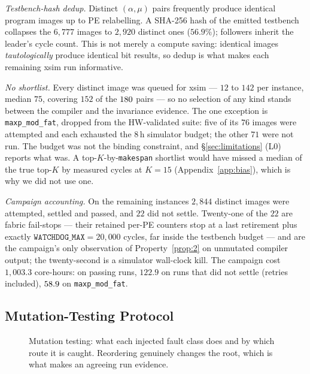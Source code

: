 \documentclass[journal,10pt]{IEEEtran}
\theoremstyle{plain}
\theoremstyle{definition}
\theoremstyle{remark}
\newcommand{\sv}[1]{\texttt{#1}}
\newcommand{\asgn}{\ensuremath{\alpha}}
\newcommand{\map}{\ensuremath{\mu}}
\begin{document}
\emph{Testbench-hash dedup.} Distinct $(\asgn, \map)$ pairs frequently produce
identical program images up to PE relabelling. A SHA-256 hash of the emitted
testbench collapses the $6{,}777$ images to $2{,}920$ distinct ones
($56.9\%$); followers inherit the leader's cycle count. This is not merely a
compute saving: identical images \emph{tautologically} produce identical bit
results, so dedup is what makes each remaining xsim run informative.

\emph{No shortlist.} Every distinct image was queued for xsim --- $12$ to
$142$ per instance, median $75$, covering $152$ of the $180$ pairs --- so no
selection of any kind stands between the compiler and the invariance
evidence. The one exception is \sv{maxp\_mod\_fat}, dropped from the
HW-validated suite: five of its $76$ images were attempted and each exhausted
the $8$\,h simulator budget; the other $71$ were not run. The budget was not
the binding constraint, and \S\ref{sec:limitations} (L0) reports what was. A
top-$K$-by-\sv{makespan} shortlist would have missed a median
\TournLeakPctFifteen{} of the true top-$K$ by measured cycles at $K = 15$
(Appendix~\ref{app:bias}), which is why we did not use one.

\emph{Campaign accounting.} On the \TournNInst{} remaining instances $2{,}844$
distinct images were attempted, \WallTBs{} settled and passed, and $22$ did
not settle. Twenty-one of the $22$ are fabric fail-stops --- their retained
per-PE counters stop at a last retirement plus exactly $\sv{WATCHDOG\_MAX} =
20{,}000$ cycles, far inside the testbench budget --- and are the campaign's
only observation of Property~\ref{prop:2} on unmutated compiler output; the
twenty-second is a simulator wall-clock kill. The campaign cost $1{,}003.3$
core-hours: \WallTotalH{} on passing runs, $122.9$ on runs that did not settle
(retries included), $58.9$ on \sv{maxp\_mod\_fat}.

\subsection{Mutation-Testing Protocol}\label{sec:method-mutation}

\begin{figure}[!t]\centering

\caption{Mutation testing: what each injected fault class does and by which route it is caught. Reordering genuinely changes the root, which is what makes an agreeing run evidence.}\label{fig:mutation}
\end{figure}
\end{document}
